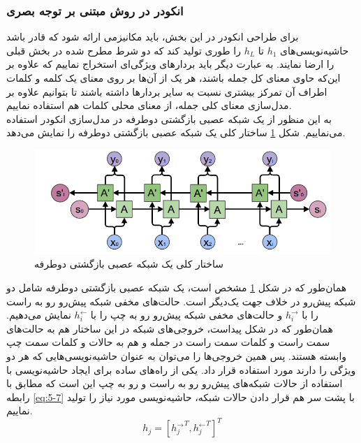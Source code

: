 \subsubsection{انکودر در روش مبتنی بر توجه بصری}
برای طراحی انکودر در این بخش، باید مکانیزمی ارائه شود که قادر باشد حاشیه‌نویسی‌های $h_1$ تا $h_L$ را طوری تولید کند که دو شرط مطرح شده در بخش قبلی را ارضا نمایند. به عبارت دیگر باید بردارهای ویژگی‌ای استخراج نماییم که علاوه بر این‌که حاوی معنای کل جمله باشند، هر یک از آن‌ها بر روی معنای یک کلمه و کلمات اطراف آن تمرکز بیشتری نسبت به سایر بردارها داشته باشند تا بتوانیم علاوه بر مدل‌سازی معنای کلی جمله، از معنای محلی کلمات هم استفاده نماییم.
\\
به این منظور از یک شبکه عصبی بازگشتی دوطرفه در مدل‌سازی انکودر استفاده می‌نماییم. شکل \ref{fig:biencoder} ساختار کلی یک شبکه عصبی بازگشتی دوطرفه را نمایش می‌دهد. 

\begin{figure}[h]
\centering
\includegraphics[scale=0.6]{Imgs/biencoder.png}
\caption{ساختار کلی یک شبکه عصبی بازگشتی دوطرفه}
\label{fig:biencoder}
\end{figure}

همان‌طور که در شکل \ref{fig:biencoder} مشخص است، یک شبکه عصبی بازگشتی دوطرفه شامل دو شبکه پیش‌رو در خلاف جهت یک‌دیگر است. حالت‌های مخفی شبکه پیش‌رو رو به راست را با $h_i^\rightarrow$ و حالت‌های مخفی شبکه پیش‌رو رو به چپ را با $h_i^\leftarrow$ نمایش می‌دهیم. همان‌طور که در شکل پیداست، خروجی‌های شبکه در این ساختار هم به حالت‌های سمت راست و کلمات سمت راست در جمله و هم به حالات و کلمات سمت چپ وابسته هستند. پس همین خروجی‌ها را می‌توان به عنوان حاشیه‌نویسی‌هایی که هر دو ویژگی را دارند مورد استفاده قرار داد.
	یکی از راه‌های ساده برای ایجاد حاشیه‌نویسی با استفاده از حالات شبکه‌های پیش‌رو رو به راست و رو به چپ این است که مطابق با رابطه \eqref{eq:5-7} با پشت سر هم قرار دادن حالات شبکه، حاشیه‌نویسی مورد نیاز را تولید نماییم.
	\begin{equation}
	h_j = [{h_j^\rightarrow}^T, {h_j^\leftarrow}^T]^T
	\label{eq:5-7}
	\end{equation}




